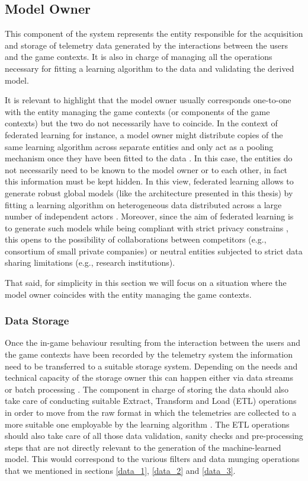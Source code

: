 \subsection{Model Owner}
\label{model_owner}
This component of the system represents the entity responsible for the acquisition and storage of telemetry data generated by the interactions between the users and the game contexts. It is also in charge of managing all the operations necessary for fitting a learning algorithm to the data and validating the derived model. 

It is relevant to highlight that the model owner usually corresponds one-to-one with the entity managing the game contexts (or components of the game contexts) but the two do not necessarily have to coincide. In the context of federated learning  \cite{yang2019federated} for instance, a model owner might distribute copies of the same learning algorithm across separate entities and only act as a pooling mechanism  once they have been fitted to the data \cite{kairouz2021advances}. In this case, the entities do not necessarily need to be known to the model owner or to each other, in fact this information must be kept hidden. In this view, federated learning allows to generate robust global models (like the architecture presented in this thesis) by fitting a learning algorithm on heterogeneous data distributed across a large number of independent actors \cite{yang2019federated, kairouz2021advances}. Moreover, since the aim of federated learning is to generate such models while being compliant with strict privacy constrains \cite{yang2019federated, kairouz2021advances}, this opens to the possibility of collaborations between competitors (e.g., consortium of small private companies) or neutral entities subjected to strict data sharing limitations (e.g., research institutions).

That said, for simplicity in this section we will focus on a situation where the model owner coincides with the entity managing the game contexts.

\subsubsection{Data Storage}
\label{data_storage}
Once the in-game behaviour resulting from the interaction between the users and the game contexts have been recorded by the telemetry system the information need to be transferred to a suitable storage system. Depending on the needs and technical capacity of the storage owner this can happen either via data streams or batch processing \cite{el2016game}. The component in charge of storing the data should also take care of conducting suitable Extract, Transform and Load (ETL) operations in order to move from the raw format in which the telemetries are collected to a more suitable one employable by the learning algorithm \cite{el2016game}. The ETL operations should also take care of all those data validation, sanity checks and pre-processing steps that are not directly relevant to the generation of the machine-learned model. This would correspond to the various filters and data munging operations that we mentioned in sections \ref{data_1}, \ref{data_2} and \ref{data_3}.

